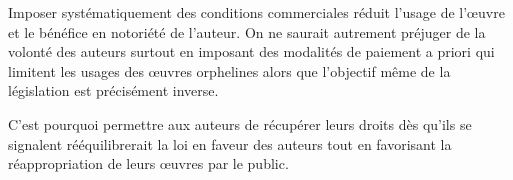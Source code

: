 Imposer systématiquement des conditions commerciales réduit l'usage de l'œuvre et le bénéfice en notoriété de l'auteur. On ne saurait autrement préjuger de la volonté des auteurs surtout en imposant des modalités de paiement a priori qui limitent les usages des œuvres orphelines alors que l'objectif même de la législation est précisément inverse.

C’est pourquoi permettre aux auteurs de récupérer leurs droits dès qu’ils se signalent rééquilibrerait la loi en faveur des auteurs tout en favorisant la réappropriation de leurs œuvres par le public.





